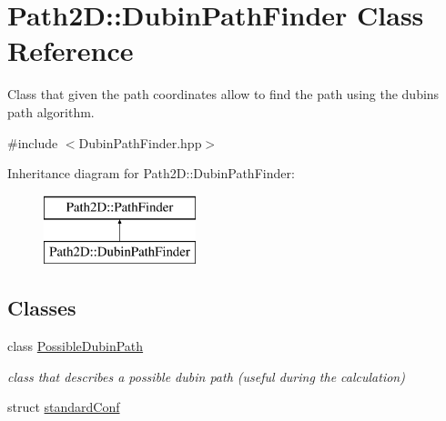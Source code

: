 \hypertarget{class_path2_d_1_1_dubin_path_finder}{}\section{Path2D\+:\+:Dubin\+Path\+Finder Class Reference}
\label{class_path2_d_1_1_dubin_path_finder}


Class that given the path coordinates allow to find the path using the dubins path algorithm.  




{\ttfamily \#include $<$Dubin\+Path\+Finder.\+hpp$>$}

Inheritance diagram for Path2D\+:\+:Dubin\+Path\+Finder\+:\begin{figure}[H]
\begin{center}
\leavevmode
\includegraphics[height=2.000000cm]{class_path2_d_1_1_dubin_path_finder}
\end{center}
\end{figure}
\subsection*{Classes}
\begin{DoxyCompactItemize}
\item 
class \mbox{\hyperlink{class_path2_d_1_1_dubin_path_finder_1_1_possible_dubin_path}{Possible\+Dubin\+Path}}
\begin{DoxyCompactList}\small\item\em class that describes a possible dubin path (useful during the calculation) \end{DoxyCompactList}\item 
struct \mbox{\hyperlink{struct_path2_d_1_1_dubin_path_finder_1_1standard_conf}{standard\+Conf}}
\end{DoxyCompactItemize}
